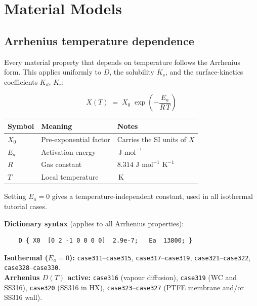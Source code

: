 \documentclass[11pt,a4paper]{article}
\newcommand{\mol}{\,\text{mol}}
\newcommand{\K}{\,\text{K}}
\newcommand{\J}{\,\text{J}}
\newcommand{\caseref}[1]{\texttt{\color{casegreen}#1}}
\begin{document}
\section{Material Models}
\label{sec:mat}

\subsection{Arrhenius temperature dependence}
\label{sec:arrhenius}

Every material property that depends on temperature follows the Arrhenius form.
This applies uniformly to $D$, the solubility $K_s$, and the surface-kinetics
coefficients $K_d$, $K_r$:

\begin{tcolorbox}[eqbox,title={Arrhenius property}]
\begin{equation}\label{eq:arrhenius}
  X(T) \;=\; X_0 \;\exp\!\left(-\frac{E_a}{R\,T}\right)
\end{equation}
\end{tcolorbox}

\begin{center}
\begin{tabular}{lll}
\toprule
Symbol & Meaning & Notes \\
\midrule
$X_0$  & Pre-exponential factor & Carries the SI units of $X$ \\
$E_a$  & Activation energy      & $\J\,\mol^{-1}$ \\
$R$    & Gas constant           & $8.314\,\J\,\mol^{-1}\,\K^{-1}$ \\
$T$    & Local temperature      & $\K$ \\
\bottomrule
\end{tabular}
\end{center}

Setting $E_a = 0$ gives a temperature-independent constant, used in all
isothermal tutorial cases.

\textbf{Dictionary syntax} (applies to all Arrhenius properties):
\begin{verbatim}
    D { X0  [0 2 -1 0 0 0 0]  2.9e-7;   Ea  13800; }
\end{verbatim}

\begin{tcolorbox}[casebox]
  \textbf{Isothermal ($E_a = 0$):} \caseref{case311}–\caseref{case315},
  \caseref{case317}–\caseref{case319}, \caseref{case321}–\caseref{case322},
  \caseref{case328}–\caseref{case330}.\\
  \textbf{Arrhenius $D(T)$ active:} \caseref{case316} (vapour diffusion),
  \caseref{case319} (WC and SS316), \caseref{case320} (SS316 in HX),
  \caseref{case323}–\caseref{case327} (PTFE membrane and/or SS316 wall).
\end{tcolorbox}
\end{document}
